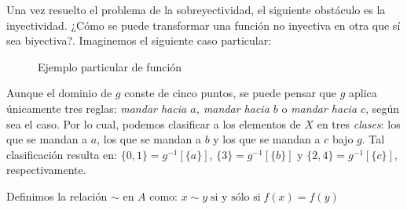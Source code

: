 \documentclass[letterpaper,DIV=14,headsepline,12pt]{scrartcl}
\begin{document}
    Una vez resuelto el problema de la sobreyectividad, el siguiente obstáculo es la inyectividad. ¿Cómo se puede transformar una función no inyectiva en otra que sí sea biyectiva?. Imaginemos el siguiente caso particular:
    \begin{figure}[H]\label{fig:ejemplo}
        \begin{center}
        \end{center}
        \caption{Ejemplo particular de función}
    \end{figure}

    Aunque el dominio de $g$ conste de cinco puntos, se puede pensar que $g$ aplica únicamente tres reglas: \textit{mandar hacia $a$, mandar hacia $b$} o \textit{mandar hacia $c$}, según sea el caso. Por lo cual, podemos clasificar a los elementos de $X$ en tres \textit{clases}: los que se mandan a $a$, los que se mandan a $b$ y los que se mandan a $c$ bajo $g$. Tal clasificación resulta en: $\{0,1\}=g^{-1}[\{a\}]$, $\{3\}=g^{-1}[\{b\}]$ y $\{2,4\}=g^{-1}[\{c\}]$, respectivamente.

    \begin{definicion}
        Definimos la relación $\sim$ en $A$ como: $ x \sim y \; \text{si y sólo si} \; f(x)=f(y)$
    \end{definicion}
\end{document}
